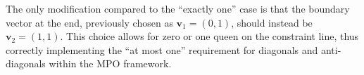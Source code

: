 \documentclass[aps, pre, reprint, amsmath, amssymb, superscriptaddress, floatfix]{revtex4-2}
\begin{document}
The only modification compared to the ``exactly one'' case is
that the boundary vector at the end, previously chosen as
$\bm{v}_1 = (0, 1)$, should instead be $\bm{v}_2 = (1, 1)$. This
choice allows for zero or one queen on the constraint line, thus
correctly implementing the ``at most one'' requirement for diagonals
and anti-diagonals within the MPO framework.


\end{document}
